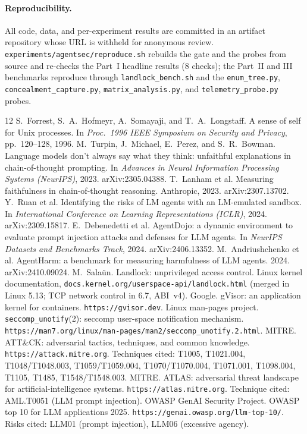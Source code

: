 \documentclass[11pt]{article}
\begin{document}
\paragraph{Reproducibility.} All code, data, and per-experiment results are committed in an artifact
repository whose URL is withheld for anonymous review. \texttt{experiments/agentsec/reproduce.sh} rebuilds
the gate and the probes from source and re-checks the Part~I headline results (8 checks); the Part~II and
III benchmarks reproduce through \texttt{landlock\_bench.sh} and the \texttt{enum\_tree.py},
\texttt{concealment\_capture.py}, \texttt{matrix\_analysis.py}, and \texttt{telemetry\_probe.py} probes.

\begin{thebibliography}{12}
 S.~Forrest, S.~A.~Hofmeyr, A.~Somayaji, and T.~A.~Longstaff. A sense of self for Unix processes. In \emph{Proc.\ 1996 IEEE Symposium on Security and Privacy}, pp.\ 120--128, 1996.
 M.~Turpin, J.~Michael, E.~Perez, and S.~R.~Bowman. Language models don't always say what they think: unfaithful explanations in chain-of-thought prompting. In \emph{Advances in Neural Information Processing Systems (NeurIPS)}, 2023. arXiv:2305.04388.
 T.~Lanham et al. Measuring faithfulness in chain-of-thought reasoning. Anthropic, 2023. arXiv:2307.13702.
 Y.~Ruan et al. Identifying the risks of LM agents with an LM-emulated sandbox. In \emph{International Conference on Learning Representations (ICLR)}, 2024. arXiv:2309.15817.
 E.~Debenedetti et al. AgentDojo: a dynamic environment to evaluate prompt injection attacks and defenses for LLM agents. In \emph{NeurIPS Datasets and Benchmarks Track}, 2024. arXiv:2406.13352.
 M.~Andriushchenko et al. AgentHarm: a benchmark for measuring harmfulness of LLM agents. 2024. arXiv:2410.09024.
 M.~Salaün. Landlock: unprivileged access control. Linux kernel documentation, \texttt{docs.kernel.org/userspace-api/landlock.html} (merged in Linux 5.13; TCP network control in 6.7, ABI~v4).
 Google. gVisor: an application kernel for containers. \texttt{https://gvisor.dev}.
 Linux man-pages project. \texttt{seccomp\_unotify}(2): seccomp user-space notification mechanism. \texttt{https://man7.org/linux/man-pages/man2/seccomp\_unotify.2.html}.
 MITRE. ATT\&CK: adversarial tactics, techniques, and common knowledge. \texttt{https://attack.mitre.org}. Techniques cited: T1005, T1021.004, T1048/T1048.003, T1059/T1059.004, T1070/T1070.004, T1071.001, T1098.004, T1105, T1485, T1548/T1548.003.
 MITRE. ATLAS: adversarial threat landscape for artificial-intelligence systems. \texttt{https://atlas.mitre.org}. Technique cited: AML.T0051 (LLM prompt injection).
 OWASP GenAI Security Project. OWASP top 10 for LLM applications 2025. \texttt{https://genai.owasp.org/llm-top-10/}. Risks cited: LLM01 (prompt injection), LLM06 (excessive agency).
\end{thebibliography}
\end{document}

